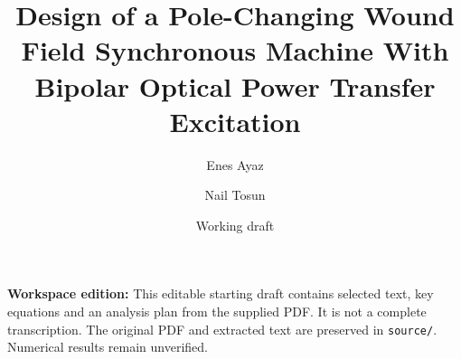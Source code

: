 \documentclass[11pt,a4paper]{article}
\title{Design of a Pole-Changing Wound Field Synchronous Machine With Bipolar Optical Power Transfer Excitation}
\author{Enes Ayaz \and Nail Tosun}
\date{Working draft}
\begin{document}
\maketitle
\noindent\textbf{Workspace edition:} This editable starting draft contains selected text, key equations and an analysis plan from the supplied PDF. It is not a complete transcription. The original PDF and extracted text are preserved in \texttt{source/}. Numerical results remain unverified.






\end{document}
